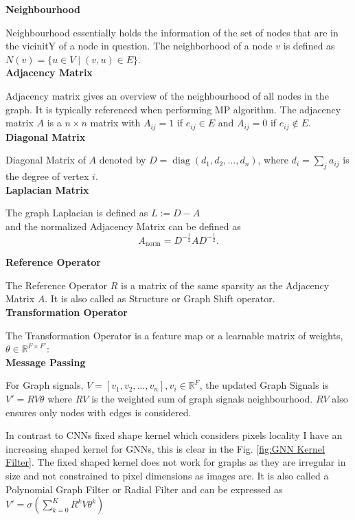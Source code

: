 \documentclass{report} %
\begin{document}
\textbf{Neighbourhood}

Neighbourhood essentially holds the information of the set of nodes that are in the vicinitY of a node in question.
The neighborhood of a node \( v \) is defined as \( N(v) = \{ u \in V \mid (v, u) \in E \} \).\\

\textbf{Adjacency Matrix}

Adjacency matrix gives an overview of the neighbourhood of all nodes in the graph. It is typically referenced when performing \ac{MP} algorithm.
The adjacency matrix \( A \) is a \( n \times n \) matrix with \( A_{ij} = 1 \) if \( e_{ij} \in E \) and \( A_{ij} = 0 \) if \( e_{ij} \notin E \).\\

\textbf{Diagonal Matrix} 

Diagonal Matrix of \( A \) denoted by  \( D = \operatorname{diag}(d_1, d_2, \dots, d_n) \), where \( d_i = \sum_{j} a_{ij} \) is the degree of vertex \( i \).\\

\textbf{Laplacian Matrix}

The graph Laplacian is defined as \( L := D - A \) \\ and the normalized Adjacency Matrix can be defined as
\[
A_{\text{norm}} = D^{-\frac{1}{2}} A D^{-\frac{1}{2}}.
\]

\textbf{Reference Operator}

The Reference Operator \( R \) is a matrix of the same sparsity as the Adjacency Matrix \( A \). It is also called as Structure or Graph Shift operator.\\

\textbf{Transformation Operator}

The Transformation Operator is a feature map or a learnable matrix of weights, \( \theta \in \mathbb{R}^{F \times F'} \):\\

\textbf{Message Passing}

For Graph signals, \( V = [v_1, v_2, \dots, v_n], v_i  \in \mathbb{R}^F \), the updated Graph Signals is \( V' = RV\theta \) 
where \( RV \) is the weighted sum of graph signals neighbourhood. \( RV \) also ensures only nodes with edges is considered.

In contrast to \ac{CNN}s fixed shape kernel which considers pixels locality I have an increasing shaped kernel for \ac{GNN}s, this is clear in the Fig. \ref{fig:GNN Kernel Filter}. 
The fixed shaped kernel does not work for graphs  as they are irregular in size and not constrained to pixel dimensions as images are. 
It is also called a Polynomial Graph Filter or Radial Filter and can be expressed as $V' = \sigma (\sum_{k=0}^{K}R^{k}V\theta^{k})$ 
\end{document}
